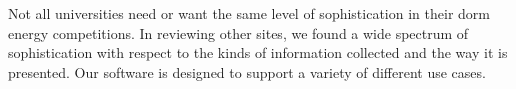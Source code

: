  Not all universities need or want the same 
level of sophistication in their dorm energy competitions.  In reviewing 
other sites, we found a wide spectrum of sophistication with respect to 
the kinds of information collected and the way it is presented.  Our software
is designed to support a variety of different use cases. 












